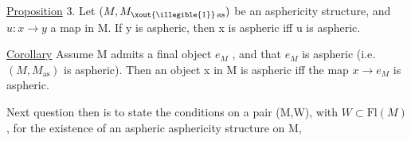 \uline{Proposition} 3.   Let $(M,M_{\xout{\illegible{1}}\,\mathrm{as}})$ be an asphericity structure,  and  $u\colon x \to y$
a map in M.  If y is aspheric,  then x is aspheric iff u is aspheric.

\uline{Corollary}  Assume M admits a final object $e_M$ ,  and that $e_M$ is aspheric
(i.e. $(M,M_{\mathrm{as}})$ is aspheric).  Then an object x in M is aspheric iff the
map $x \to e_M$ is aspheric.

Next question then is to state the conditions on a pair (M,W), with
$W \subset \mathrm{Fl}(M)$,  for the existence of an aspheric asphericity structure on M,
